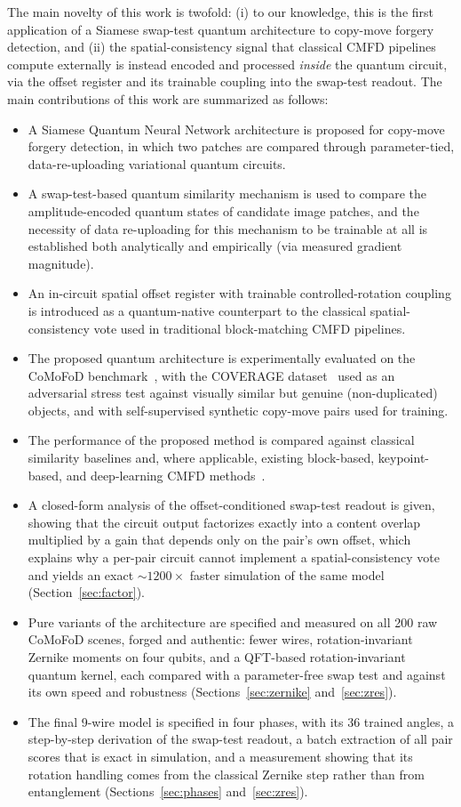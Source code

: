 \documentclass[conference]{IEEEtran}
\begin{document}
The main novelty of this work is twofold: (i) to our knowledge, this is the first application of a Siamese swap-test quantum architecture to copy-move forgery detection, and (ii) the spatial-consistency signal that classical CMFD pipelines compute externally is instead encoded and processed \emph{inside} the quantum circuit, via the offset register and its trainable coupling into the swap-test readout. The main contributions of this work are summarized as follows:
\begin{itemize}
\item A Siamese Quantum Neural Network architecture is proposed for copy-move forgery detection, in which two patches are compared through parameter-tied, data-re-uploading variational quantum circuits.
\item A swap-test-based quantum similarity mechanism is used to compare the amplitude-encoded quantum states of candidate image patches, and the necessity of data re-uploading for this mechanism to be trainable at all is established both analytically and empirically (via measured gradient magnitude).
\item An in-circuit spatial offset register with trainable controlled-rotation coupling is introduced as a quantum-native counterpart to the classical spatial-consistency vote used in traditional block-matching CMFD pipelines.
\item The proposed quantum architecture is experimentally evaluated on the CoMoFoD benchmark~\cite{comofod2013}, with the COVERAGE dataset~\cite{coverage2016} used as an adversarial stress test against visually similar but genuine (non-duplicated) objects, and with self-supervised synthetic copy-move pairs used for training.
\item The performance of the proposed method is compared against classical similarity baselines and, where applicable, existing block-based, keypoint-based, and deep-learning CMFD methods~\cite{fridrich2003,amerini2011,busternet2018}.
\item A closed-form analysis of the offset-conditioned swap-test readout is given, showing that the circuit output factorizes exactly into a content overlap multiplied by a gain that depends only on the pair's own offset, which explains why a per-pair circuit cannot implement a spatial-consistency vote and yields an exact $\sim\!1200\times$ faster simulation of the same model (Section~\ref{sec:factor}).
\item Pure variants of the architecture are specified and measured on all 200 raw CoMoFoD scenes, forged and authentic: fewer wires, rotation-invariant Zernike moments on four qubits, and a QFT-based rotation-invariant quantum kernel, each compared with a parameter-free swap test and against its own speed and robustness (Sections~\ref{sec:zernike} and~\ref{sec:zres}).
\item The final 9-wire model is specified in four phases, with its 36 trained angles, a step-by-step derivation of the swap-test readout, a batch extraction of all pair scores that is exact in simulation, and a measurement showing that its rotation handling comes from the classical Zernike step rather than from entanglement (Sections~\ref{sec:phases} and~\ref{sec:zres}).
\end{itemize}
\end{document}
